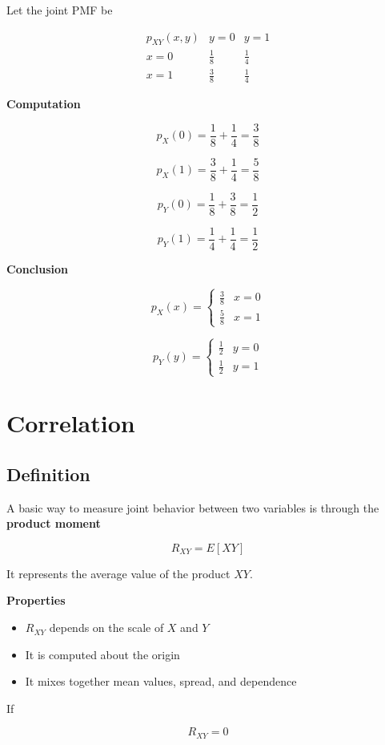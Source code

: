 \documentclass[12pt]{article}
\begin{document}
Let the joint PMF be

\[
\begin{array}{c|cc}
p_{XY}(x,y) & y=0 & y=1 \\
\hline
x=0 & \frac18 & \frac14 \\
x=1 & \frac38 & \frac14
\end{array}
\]

\textbf{Computation}

\[
p_X(0) = \frac18 + \frac14 = \frac38
\]

\[
p_X(1) = \frac38 + \frac14 = \frac58
\]

\[
p_Y(0) = \frac18 + \frac38 = \frac12
\]

\[
p_Y(1) = \frac14 + \frac14 = \frac12
\]

\textbf{Conclusion}

\[
p_X(x) =
\begin{cases}
\frac38 & x=0 \\
\frac58 & x=1
\end{cases}
\]

\[
p_Y(y) =
\begin{cases}
\frac12 & y=0 \\
\frac12 & y=1
\end{cases}
\]

\section{Correlation}

\subsection{Definition}

A basic way to measure joint behavior between two variables is through the \textbf{product moment}

\[
R_{XY} = E[XY]
\]

It represents the average value of the product $XY$.

\textbf{Properties}

\begin{itemize}
\item $R_{XY}$ depends on the scale of $X$ and $Y$
\item It is computed about the origin
\item It mixes together mean values, spread, and dependence
\end{itemize}

If

\[
R_{XY} = 0
\]
\end{document}
